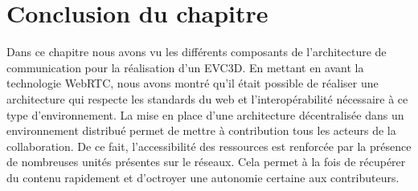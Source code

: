 




\section{Conclusion du chapitre}
Dans ce chapitre nous avons vu les différents composants de l'architecture de 
communication pour la réalisation d'un \gls{EVC3D}. En mettant en avant la 
technologie WebRTC, nous avons montré qu'il était possible de réaliser une 
architecture qui respecte les standards du web et l'interopérabilité nécessaire à ce 
type d'environnement. La mise en place d'une architecture décentralisée dans un 
environnement distribué permet de mettre à contribution tous les acteurs de la 
collaboration. De ce fait, l'accessibilité des ressources est renforcée par la 
présence de nombreuses unités présentes sur le réseaux. Cela permet à la fois 
de récupérer du contenu rapidement et d'octroyer une autonomie certaine aux 
contributeurs. 
